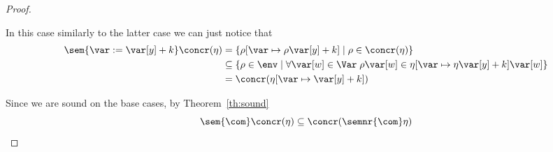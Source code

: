 \begin{proof}
\begin{inductive}
     In this case similarly to the
    latter case we can just notice that
    \begin{align*}
      \sem{\var := \var[y] + k}\concr(\eta) & = \{\rho[\var\mapsto \rho\var[y] + k] \mid \rho \in \concr(\eta)\} \\
                                            & \subseteq \{\rho \in \env \mid \forall \var[w] \in \Var \; \rho\var[w] \in \eta[\var\mapsto \eta\var[y] + k]\var[w]\} \\
                                            & = \concr(\eta[\var\mapsto \var[y] + k])
    \end{align*}
  \end{inductive}
  Since we are sound on the base cases, by Theorem~\ref{th:sound}
  \begin{equation*}
    \sem{\com}\concr(\eta) \subseteq \concr(\semnr{\com}\eta)
  \end{equation*}
\end{proof}
